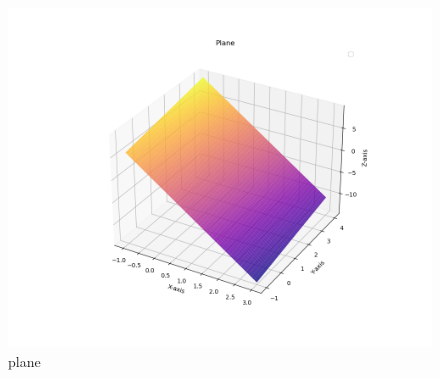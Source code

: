 \documentclass[journal]{IEEEtran}
\theoremstyle{remark}
\begin{document}
\newpage
\begin{figure}[H]
    \centering
    \includegraphics[width=0.9\columnwidth]{figs/plane.png}
    \caption{plane}
    \label{fig:placeholder_1}
\end{figure}
\end{document}
